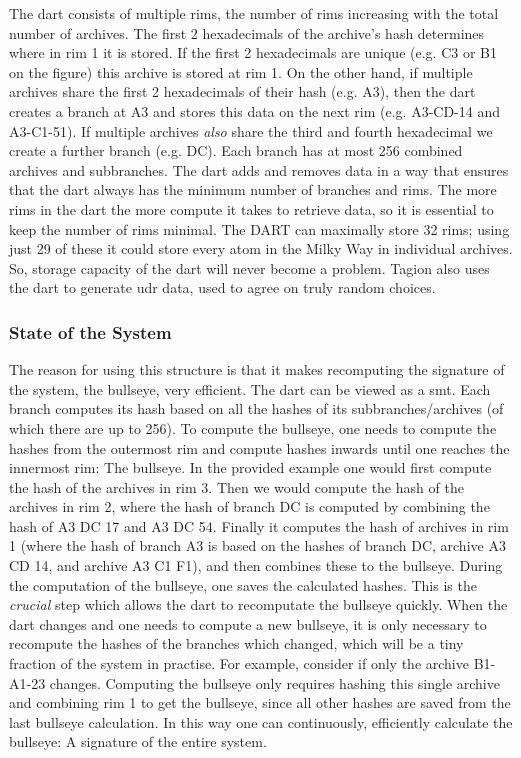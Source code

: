     The \gls{dart} consists of multiple rims, the number of rims increasing with the total number of archives. The first 2 hexadecimals of the archive's hash determines where in rim 1 it is stored. If the first 2 hexadecimals are unique (e.g. C3 or B1 on the figure) this archive is stored at rim 1. On the other hand, if multiple archives share the first 2 hexadecimals of their hash (e.g. A3), then the dart creates a branch at A3 and stores this data on the next rim (e.g. A3-CD-14 and A3-C1-51). If multiple archives \textit{also} share the third and fourth hexadecimal we create a further branch (e.g. DC). Each branch has at most 256 combined archives and subbranches. The \gls{dart} adds and removes data in a way that ensures that the \gls{dart} always has the minimum number of branches and rims. The more rims in the \gls{dart} the more compute it takes to retrieve data, so it is essential to keep the number of rims minimal. The DART can maximally store 32 rims; using just 29 of these it could store every atom in the Milky Way in individual archives. So, storage capacity of the \gls{dart} will never become a problem. Tagion also uses the \gls{dart} to generate \gls{udr} data, used to agree on truly random choices.

\subsubsection{State of the System}
    The reason for using this structure is that it makes recomputing the signature of the system, the \gls{bullseye}, very efficient. The \gls{dart} can be viewed as a \gls{smt}. Each branch computes its hash based on all the hashes of its subbranches/archives (of which there are up to 256). To compute the \gls{bullseye}, one needs to compute the hashes from the outermost rim and compute hashes inwards until one reaches the innermost rim: The \gls{bullseye}. In the provided example one would first compute the hash of the archives in rim 3. Then we would compute the hash of the archives in rim 2, where the hash of branch DC is computed by combining the hash of A3 DC 17 and A3 DC 54. Finally it computes the hash of archives in rim 1 (where the hash of branch A3 is based on the hashes of branch DC, archive A3 CD 14, and archive A3 C1 F1), and then combines these to the \gls{bullseye}. During the computation of the \gls{bullseye}, one saves the calculated hashes. This is the \textit{crucial} step which allows the \gls{dart} to recomputate the \gls{bullseye} quickly. When the \gls{dart} changes and one needs to compute a new \gls{bullseye}, it is only necessary to recompute the hashes of the branches which changed, which will be a tiny fraction of the system in practise. For example, consider if only the archive B1-A1-23 changes. Computing the \gls{bullseye} only requires hashing this single archive and combining rim 1 to get the \gls{bullseye}, since all other hashes are saved from the last \gls{bullseye} calculation. In this way one can continuously, efficiently calculate the \gls{bullseye}: A signature of the entire system.

